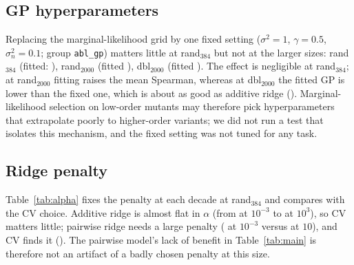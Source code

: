 \subsection{GP hyperparameters}
Replacing the marginal-likelihood grid by one fixed setting ($\sigma^2{=}1$, $\gamma{=}0.5$, $\sigma_n^2{=}0.1$; group \texttt{abl\_gp}) matters little at rand$_{384}$ but not at the larger sizes: rand$_{384}$  (fitted: ), rand$_{2000}$  (fitted ), dbl$_{2000}$  (fitted ). The effect is negligible at rand$_{384}$; at rand$_{2000}$ fitting raises the mean Spearman, whereas at dbl$_{2000}$ the fitted GP is lower than the fixed one, which is about as good as additive ridge (). Marginal-likelihood selection on low-order mutants may therefore pick hyperparameters that extrapolate poorly to higher-order variants; we did not run a test that isolates this mechanism, and the fixed setting was not tuned for any task.

\subsection{Ridge penalty}
Table~\ref{tab:alpha} fixes the penalty at each decade at rand$_{384}$ and compares with the CV choice. Additive ridge is almost flat in $\alpha$ (from  at $10^{-3}$ to  at $10^{3}$), so CV matters little; pairwise ridge needs a large penalty ( at $10^{-3}$ versus  at $10$), and CV finds it (). The pairwise model's lack of benefit in Table~\ref{tab:main} is therefore not an artifact of a badly chosen penalty at this size.

\begin{table}[t]\footnotesize\centering\renewcommand{\arraystretch}{0.8}
\caption{Mean Spearman at rand$_{384}$ as a function of the fixed ridge penalty $\alpha$, and with the CV-selected penalty (main group).}\label{tab:alpha}
\resizebox{\columnwidth}{!}{}
\end{table}

